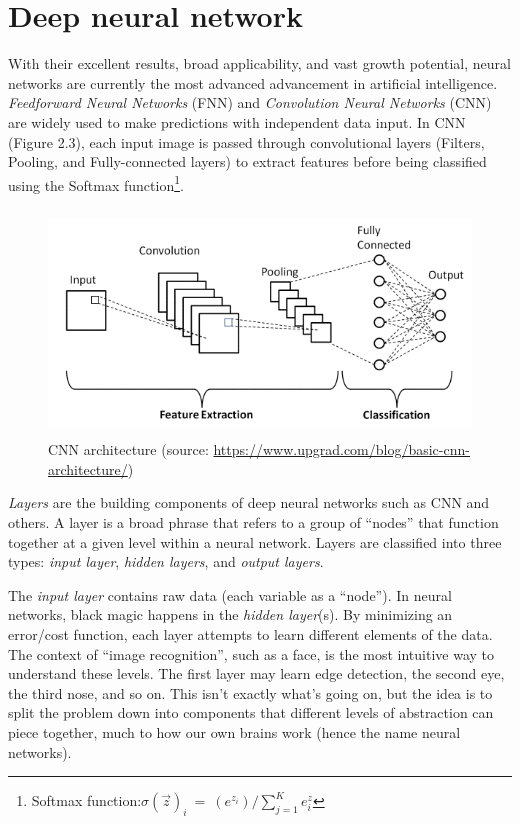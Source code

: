 \section{Deep neural network}
\label{sec:deep_neural_network}
\hspace{0.5cm}With their excellent results, broad applicability, and vast growth potential, neural networks are currently the most advanced advancement in artificial intelligence. \textit{Feedforward Neural Networks }(FNN) and \textit{Convolution Neural Networks} (CNN) are widely used to make predictions with independent data input. In CNN (Figure 2.3), each input image is passed through convolutional layers (Filters, Pooling, and Fully-connected layers) to extract features before being classified using the Softmax function\footnote{Softmax function:$ \sigma (\overrightarrow{z})_i \: = \: (e^{z_i})/ \sum_{j=1}^{K} e^z_i  $}.
\begin{figure}[h!]
	\centering
	\includegraphics[width=\linewidth, height=6cm,keepaspectratio]{figures/CNN.png}
	\caption{CNN architecture (source: \url{https://www.upgrad.com/blog/basic-cnn-architecture/})}
\end{figure}	

\newpage
\emph{Layers} are the building components of deep neural networks such as CNN and others. A layer is a broad phrase that refers to a group of ``nodes'' that function together at a given level within a neural network. Layers are classified into three types: \emph{input layer},\emph{ hidden layers}, and \emph{output layers}.

The \emph{input layer} contains raw data (each variable as a ``node'').
In neural networks, black magic happens in the \emph{hidden layer}(s). By minimizing an error/cost function, each layer attempts to learn different elements of the data. The context of ``image recognition'', such as a face, is the most intuitive way to understand these levels. The first layer may learn edge detection, the second eye, the third nose, and so on. This isn't exactly what's going on, but the idea is to split the problem down into components that different levels of abstraction can piece together, much to how our own brains work (hence the name neural networks).

